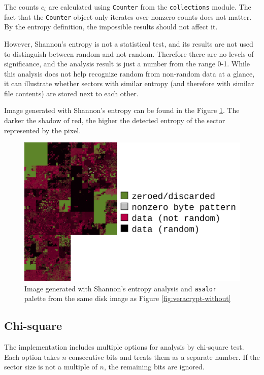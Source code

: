\documentclass[
  digital, %
  color,   %
  oneside, %
  lof,     %
  nolot,     %
]{fithesis4}
\begin{document}
The counts $c_i$ are calculated using \texttt{Counter} from the \texttt{collections} module\cite{collections}.
The fact that the \texttt{Counter} object only iterates over nonzero counts does not matter.
By the entropy definition, the impossible results should not affect it.

However, Shannon's entropy is not a statistical test, and its results are not used to distinguish between random and not random.
Therefore there are no levels of significance, and the analysis result is just a number from the range 0-1.
While this analysis does not help recognize random from non-random data at a glance, it can illustrate whether sectors with similar entropy (and therefore with similar file contents) are stored next to each other. 

Image generated with Shannon's entropy can be found in the Figure \ref{fig:impl-shannon}.
The darker the shadow of red, the higher the detected entropy of the sector represented by the pixel.

\begin{figure}
    \centering
    \includegraphics[width=\textwidth,interpolate=false]{ubnt-unencrypted-shannon-hilbert-asalor.png}
    \caption{Image generated with Shannon's entropy analysis and \texttt{asalor} palette from the same disk image as Figure \ref{fig:veracrypt-without}}
    \label{fig:impl-shannon}
\end{figure}

\subsection{Chi-square}
\label{ssec:chi2}

The implementation includes multiple options for analysis by chi-square test.
Each option takes $n$ consecutive bits and treats them as a separate number.
If the sector size is not a multiple of $n$, the remaining bits are ignored.
\end{document}
